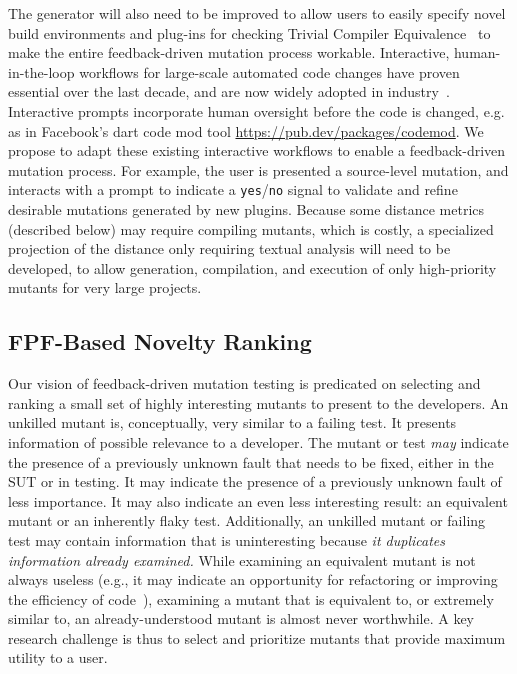 The generator will also need to be improved to allow users to easily specify
novel build environments and plug-ins for checking Trivial Compiler
Equivalence~\cite{TCE} to make the entire feedback-driven mutation process
workable. Interactive, human-in-the-loop workflows for large-scale automated
code changes have proven essential over the last decade, and are now widely
adopted in industry~\cite{codemod-gh,
  codemod-fb-post-by-codemod-author, dart-codemod}. Interactive
prompts incorporate human oversight before the code is changed,
e.g. as in Facebook's dart code mod tool \url{https://pub.dev/packages/codemod}. 
We propose to adapt these existing interactive workflows to enable a
feedback-driven mutation process. For example, the user is presented a source-level mutation, and interacts with a prompt to indicate a {\tt yes}/{\tt no} signal
to validate and refine desirable mutations generated by new plugins.
 Because some distance
metrics (described below) may require compiling mutants, which is costly, a specialized
projection of the distance only requiring textual analysis will need
to be developed, to allow generation, compilation, and execution of
only high-priority mutants for very large projects.


\subsection{FPF-Based Novelty Ranking}
\label{sec:fpfplan}



Our vision of feedback-driven mutation testing is predicated on selecting and ranking a small
set of highly interesting mutants to present to the developers.  An unkilled
mutant is, conceptually, very similar to a failing test.  It presents
information of possible relevance to a developer.  The mutant or test \emph{may}
indicate the presence of a previously unknown fault that needs to be fixed,
either in the SUT or in testing.  It may indicate the presence of a previously
unknown fault of less importance.  It may also indicate an even less interesting
result: an equivalent mutant or an inherently flaky test.  Additionally, an
unkilled mutant or failing test may contain information that is uninteresting
because \emph{it duplicates information already examined.}  While examining an
equivalent mutant is not always useless (e.g., it may indicate an opportunity
for refactoring or improving the efficiency of
code~\cite{ivankovic2018industrial,groce2018verified}), examining a mutant that
is equivalent to, or extremely similar to, an already-understood mutant is
almost never worthwhile.  A key research challenge is thus to select and
prioritize mutants that provide maximum utility to a user.

